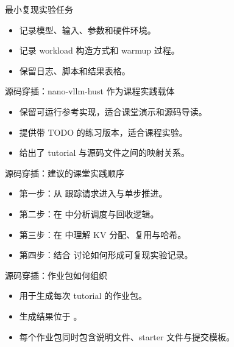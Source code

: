\begin{frame}{最小复现实验任务}
  \begin{itemize}
    \item 记录模型、输入、参数和硬件环境。
    \item 记录 workload 构造方式和 warmup 过程。
    \item 保留日志、脚本和结果表格。
  \end{itemize}
\end{frame}

\begin{frame}{源码穿插：nano-vllm-hust 作为课程实践载体}
  \begin{itemize}
    \item \texttt{} 保留可运行参考实现，适合课堂演示和源码导读。
    \item \texttt{} 提供带 TODO 的练习版本，适合课程实验。
    \item \texttt{} 给出了 tutorial 与源码文件之间的映射关系。
  \end{itemize}
\end{frame}

\begin{frame}{源码穿插：建议的课堂实践顺序}
  \begin{itemize}
    \item 第一步：从 \texttt{} 跟踪请求进入与单步推进。
    \item 第二步：在 \texttt{} 中分析调度与回收逻辑。
    \item 第三步：在 \texttt{} 中理解 KV 分配、复用与哈希。
    \item 第四步：结合 \texttt{} 讨论如何形成可复现实验记录。
  \end{itemize}
\end{frame}

\begin{frame}{源码穿插：作业包如何组织}
  \begin{itemize}
    \item \texttt{} 用于生成每次 tutorial 的作业包。
    \item 生成结果位于 \texttt{}。
    \item 每个作业包同时包含说明文件、starter 文件与提交模板。
  \end{itemize}
\end{frame}

